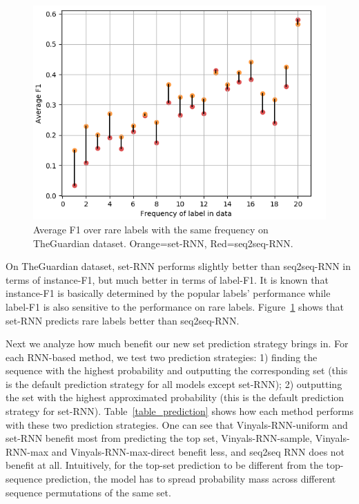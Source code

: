 \begin{figure}[t]
\includegraphics[width=1.0\columnwidth]{figs/labelf1.png}

\caption{Average F1 over rare labels with the same frequency on TheGuardian dataset. Orange=set-RNN, Red=seq2seq-RNN.}
\label{fig:labelf1}
\end{figure}

On TheGuardian dataset, set-RNN performs slightly better than seq2seq-RNN in terms of instance-F1, but much better in terms of label-F1. It is known that instance-F1 is basically determined by the popular labels' performance while label-F1 is also sensitive to the performance on rare labels. Figure~\ref{fig:labelf1} shows that set-RNN predicts rare labels better than seq2seq-RNN.

Next we analyze how much benefit our new set prediction strategy brings in. For each RNN-based method, we test two prediction strategies: 1) finding the sequence with the highest probability and outputting the corresponding set (this is the default prediction strategy for all models except set-RNN); 2) outputting the set with the highest approximated probability (this is the default prediction strategy for set-RNN). Table~\ref{table_prediction} shows how each method performs with these two prediction strategies. One can see that Vinyals-RNN-uniform and set-RNN benefit most from predicting the top set,  Vinyals-RNN-sample, Vinyals-RNN-max and Vinyals-RNN-max-direct benefit less, and seq2seq RNN does not benefit at all. Intuitively, for the top-set prediction to be different from the top-sequence prediction, the model has to spread probability mass across different sequence permutations of the same set. 

